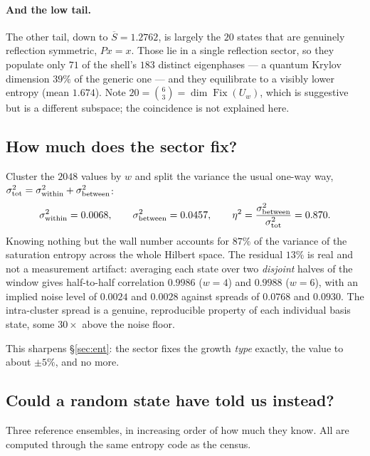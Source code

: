 \documentclass[11pt]{article}
\newcommand{\Fix}{\operatorname{Fix}}
\theoremstyle{plain}
\theoremstyle{definition}
\begin{document}
\paragraph{And the low tail.} The other tail, down to $\overline{S}=1.2762$,
is largely the $20$ states that are genuinely reflection symmetric, $Px=x$.
Those lie in a single reflection sector, so they populate only $71$ of the
shell's $183$ distinct eigenphases --- a quantum Krylov dimension $39\%$ of the
generic one --- and they equilibrate to a visibly lower entropy
(mean $1.674$). Note $20=\binom{6}{3}=\dim\Fix(U_w)$, which is suggestive but is
a different subspace; the coincidence is not explained here.

\subsection{How much does the sector fix?}

Cluster the $2048$ values by $w$ and split the variance the usual one-way way,
$\sigma^2_{\rm tot}=\sigma^2_{\rm within}+\sigma^2_{\rm between}$:
\begin{equation}
\sigma^2_{\rm within}=0.0068,\qquad
\sigma^2_{\rm between}=0.0457,\qquad
\eta^2=\frac{\sigma^2_{\rm between}}{\sigma^2_{\rm tot}}=0.870 .
\label{eq:eta}
\end{equation}
Knowing nothing but the wall number accounts for $87\%$ of the variance of the
saturation entropy across the whole Hilbert space. The residual $13\%$ is real
and not a measurement artifact: averaging each state over two \emph{disjoint}
halves of the window gives half-to-half correlation $0.9986$ ($w=4$) and
$0.9988$ ($w=6$), with an implied noise level of $0.0024$ and $0.0028$ against
spreads of $0.0768$ and $0.0930$. The intra-cluster spread is a genuine,
reproducible property of each individual basis state, some $30\times$ above the
noise floor.

This sharpens \S\ref{sec:ent}: the sector fixes the growth \emph{type} exactly,
the value to about $\pm5\%$, and no more.

\subsection{Could a random state have told us instead?}

Three reference ensembles, in increasing order of how much they know. All are
computed through the same entropy code as the census.
\end{document}
